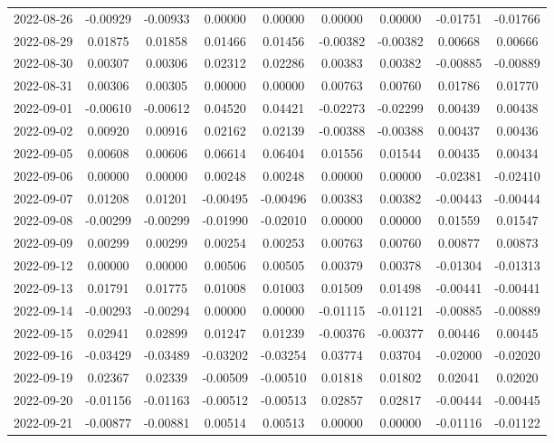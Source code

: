 \begin{footnotesize}
\begin{longtable}{lcccccccc}
2022-08-26 & -0.00929 & -0.00933 & 0.00000 & 0.00000 & 0.00000 & 0.00000 & -0.01751 & -0.01766 \\
2022-08-29 & 0.01875 & 0.01858 & 0.01466 & 0.01456 & -0.00382 & -0.00382 & 0.00668 & 0.00666 \\
2022-08-30 & 0.00307 & 0.00306 & 0.02312 & 0.02286 & 0.00383 & 0.00382 & -0.00885 & -0.00889 \\
2022-08-31 & 0.00306 & 0.00305 & 0.00000 & 0.00000 & 0.00763 & 0.00760 & 0.01786 & 0.01770 \\
2022-09-01 & -0.00610 & -0.00612 & 0.04520 & 0.04421 & -0.02273 & -0.02299 & 0.00439 & 0.00438 \\
2022-09-02 & 0.00920 & 0.00916 & 0.02162 & 0.02139 & -0.00388 & -0.00388 & 0.00437 & 0.00436 \\
2022-09-05 & 0.00608 & 0.00606 & 0.06614 & 0.06404 & 0.01556 & 0.01544 & 0.00435 & 0.00434 \\
2022-09-06 & 0.00000 & 0.00000 & 0.00248 & 0.00248 & 0.00000 & 0.00000 & -0.02381 & -0.02410 \\
2022-09-07 & 0.01208 & 0.01201 & -0.00495 & -0.00496 & 0.00383 & 0.00382 & -0.00443 & -0.00444 \\
2022-09-08 & -0.00299 & -0.00299 & -0.01990 & -0.02010 & 0.00000 & 0.00000 & 0.01559 & 0.01547 \\
2022-09-09 & 0.00299 & 0.00299 & 0.00254 & 0.00253 & 0.00763 & 0.00760 & 0.00877 & 0.00873 \\
2022-09-12 & 0.00000 & 0.00000 & 0.00506 & 0.00505 & 0.00379 & 0.00378 & -0.01304 & -0.01313 \\
2022-09-13 & 0.01791 & 0.01775 & 0.01008 & 0.01003 & 0.01509 & 0.01498 & -0.00441 & -0.00441 \\
2022-09-14 & -0.00293 & -0.00294 & 0.00000 & 0.00000 & -0.01115 & -0.01121 & -0.00885 & -0.00889 \\
2022-09-15 & 0.02941 & 0.02899 & 0.01247 & 0.01239 & -0.00376 & -0.00377 & 0.00446 & 0.00445 \\
2022-09-16 & -0.03429 & -0.03489 & -0.03202 & -0.03254 & 0.03774 & 0.03704 & -0.02000 & -0.02020 \\
2022-09-19 & 0.02367 & 0.02339 & -0.00509 & -0.00510 & 0.01818 & 0.01802 & 0.02041 & 0.02020 \\
2022-09-20 & -0.01156 & -0.01163 & -0.00512 & -0.00513 & 0.02857 & 0.02817 & -0.00444 & -0.00445 \\
2022-09-21 & -0.00877 & -0.00881 & 0.00514 & 0.00513 & 0.00000 & 0.00000 & -0.01116 & -0.01122 \\

\end{longtable}
\end{footnotesize}
